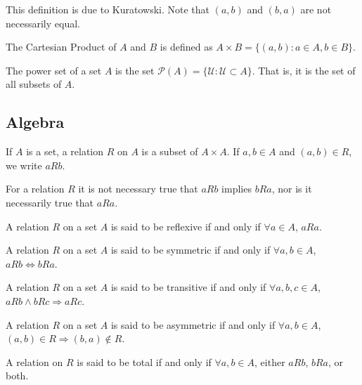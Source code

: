 \documentclass[crop=false,class=book,oneside]{standalone}
\begin{document}
            \begin{remark}
            This definition is due to Kuratowski. Note that $(a,b)$ and $(b,a)$ are not necessarily equal.
            \end{remark}
            \begin{definition}
            The Cartesian Product of $A$ and $B$ is defined as $A\times B = \{(a,b):a\in A, b\in B\}$.
            \end{definition}
            \begin{definition}
            The power set of a set $A$ is the set $\mathcal{P}(A) = \{\mathcal{U}:\mathcal{U}\subset A\}$. That is, it is the set of all subsets of $A$.
            \end{definition}
    \subsection{Algebra}
        \begin{definition}
        If $A$ is a set, a relation $R$ on $A$ is a subset of $A\times A$. If $a,b\in A$ and $(a,b)\in R$, we write $aR b$.
        \end{definition}
        \begin{remark}
        For a relation $R$ it is not necessary true that $aRb$ implies $bRa$, nor is it necessarily true that $aRa$.
        \end{remark}
        \begin{definition}
        A relation $R$ on a set $A$ is said to be reflexive if and only if $\forall a\in A$, $aRa$.
        \end{definition}
        \begin{definition}
        A relation $R$ on a set $A$ is said to be symmetric if and only if $\forall a,b\in A$, $aRb\Leftrightarrow bRa$.
        \end{definition}
        \begin{definition}
        A relation $R$ on a set $A$ is said to be transitive if and only if $\forall a,b,c\in A$, $aRb \land bRc \Rightarrow aRc$.
        \end{definition}
        \begin{definition}
        A relation $R$ on a set $A$ is said to be asymmetric if and only if $\forall a,b\in A$, $(a,b)\in R\Rightarrow (b,a) \notin R$.
        \end{definition}
        \begin{definition}
        A relation on $R$ is said to be total if and only if $\forall a,b \in A$, either $aRb$, $bRa$, or both.
        \end{definition}
\end{document}
